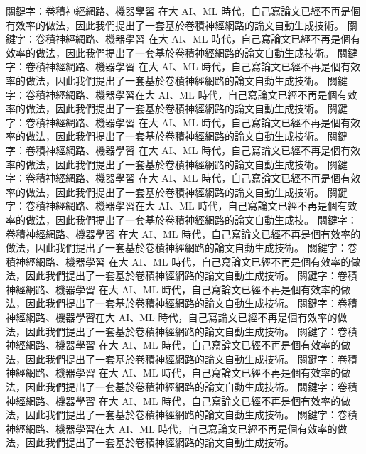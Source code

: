 關鍵字：卷積神經網路、機器學習 在大 AI、ML 時代，自己寫論文已經不再是個有效率的做法，因此我們提出了一套基於卷積神經網路的論文自動生成技術。 
關鍵字：卷積神經網路、機器學習 在大 AI、ML 時代，自己寫論文已經不再是個有效率的做法，因此我們提出了一套基於卷積神經網路的論文自動生成技術。 
關鍵字：卷積神經網路、機器學習 在大 AI、ML 時代，自己寫論文已經不再是個有效率的做法，因此我們提出了一套基於卷積神經網路的論文自動生成技術。 
關鍵字：卷積神經網路、機器學習在大 AI、ML 時代，自己寫論文已經不再是個有效率的做法，因此我們提出了一套基於卷積神經網路的論文自動生成技術。 
關鍵字：卷積神經網路、機器學習 在大 AI、ML 時代，自己寫論文已經不再是個有效率的做法，因此我們提出了一套基於卷積神經網路的論文自動生成技術。 
關鍵字：卷積神經網路、機器學習 在大 AI、ML 時代，自己寫論文已經不再是個有效率的做法，因此我們提出了一套基於卷積神經網路的論文自動生成技術。 
關鍵字：卷積神經網路、機器學習 在大 AI、ML 時代，自己寫論文已經不再是個有效率的做法，因此我們提出了一套基於卷積神經網路的論文自動生成技術。 
關鍵字：卷積神經網路、機器學習在大 AI、ML 時代，自己寫論文已經不再是個有效率的做法，因此我們提出了一套基於卷積神經網路的論文自動生成技。
關鍵字：卷積神經網路、機器學習 在大 AI、ML 時代，自己寫論文已經不再是個有效率的做法，因此我們提出了一套基於卷積神經網路的論文自動生成技術。 
關鍵字：卷積神經網路、機器學習 在大 AI、ML 時代，自己寫論文已經不再是個有效率的做法，因此我們提出了一套基於卷積神經網路的論文自動生成技術。 
關鍵字：卷積神經網路、機器學習 在大 AI、ML 時代，自己寫論文已經不再是個有效率的做法，因此我們提出了一套基於卷積神經網路的論文自動生成技術。 
關鍵字：卷積神經網路、機器學習在大 AI、ML 時代，自己寫論文已經不再是個有效率的做法，因此我們提出了一套基於卷積神經網路的論文自動生成技術。
關鍵字：卷積神經網路、機器學習 在大 AI、ML 時代，自己寫論文已經不再是個有效率的做法，因此我們提出了一套基於卷積神經網路的論文自動生成技術。 
關鍵字：卷積神經網路、機器學習 在大 AI、ML 時代，自己寫論文已經不再是個有效率的做法，因此我們提出了一套基於卷積神經網路的論文自動生成技術。 
關鍵字：卷積神經網路、機器學習 在大 AI、ML 時代，自己寫論文已經不再是個有效率的做法，因此我們提出了一套基於卷積神經網路的論文自動生成技術。 
關鍵字：卷積神經網路、機器學習在大 AI、ML 時代，自己寫論文已經不再是個有效率的做法，因此我們提出了一套基於卷積神經網路的論文自動生成技術。

